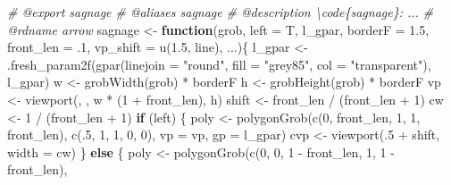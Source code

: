 \documentclass[
]{article}
\newenvironment{Shaded}{\begin{snugshade}}{\end{snugshade}}
\newcommand{\AttributeTok}[1]{\textcolor[rgb]{0.77,0.63,0.00}{#1}}
\newcommand{\CommentTok}[1]{\textcolor[rgb]{0.56,0.35,0.01}{\textit{#1}}}
\newcommand{\ControlFlowTok}[1]{\textcolor[rgb]{0.13,0.29,0.53}{\textbf{#1}}}
\newcommand{\DecValTok}[1]{\textcolor[rgb]{0.00,0.00,0.81}{#1}}
\newcommand{\FloatTok}[1]{\textcolor[rgb]{0.00,0.00,0.81}{#1}}
\newcommand{\FunctionTok}[1]{\textcolor[rgb]{0.00,0.00,0.00}{#1}}
\newcommand{\NormalTok}[1]{#1}
\newcommand{\OtherTok}[1]{\textcolor[rgb]{0.56,0.35,0.01}{#1}}
\newcommand{\SpecialCharTok}[1]{\textcolor[rgb]{0.00,0.00,0.00}{#1}}
\newcommand{\StringTok}[1]{\textcolor[rgb]{0.31,0.60,0.02}{#1}}
\begin{document}
\begin{Shaded}
\begin{Highlighting}[]
\CommentTok{\#\textquotesingle{} @export sagnage}
\CommentTok{\#\textquotesingle{} @aliases sagnage}
\CommentTok{\#\textquotesingle{} @description \textbackslash{}code\{sagnage\}: ...}
\CommentTok{\#\textquotesingle{} @rdname arrow}
\NormalTok{sagnage }\OtherTok{\textless{}{-}} \ControlFlowTok{function}\NormalTok{(grob, }\AttributeTok{left =}\NormalTok{ T, l\_gpar, }\AttributeTok{borderF =} \FloatTok{1.5}\NormalTok{, }\AttributeTok{front\_len =}\NormalTok{ .}\DecValTok{1}\NormalTok{,}
  \AttributeTok{vp\_shift =} \FunctionTok{u}\NormalTok{(}\FloatTok{1.5}\NormalTok{, line), ...)\{}
\NormalTok{  l\_gpar }\OtherTok{\textless{}{-}} \FunctionTok{.fresh\_param2f}\NormalTok{(}\FunctionTok{gpar}\NormalTok{(}\AttributeTok{linejoin =} \StringTok{"round"}\NormalTok{, }\AttributeTok{fill =} \StringTok{"grey85"}\NormalTok{,}
      \AttributeTok{col =} \StringTok{"transparent"}\NormalTok{), l\_gpar)}
\NormalTok{  w }\OtherTok{\textless{}{-}} \FunctionTok{grobWidth}\NormalTok{(grob) }\SpecialCharTok{*}\NormalTok{ borderF}
\NormalTok{  h }\OtherTok{\textless{}{-}} \FunctionTok{grobHeight}\NormalTok{(grob) }\SpecialCharTok{*}\NormalTok{ borderF}
\NormalTok{  vp }\OtherTok{\textless{}{-}} \FunctionTok{viewport}\NormalTok{(, , w }\SpecialCharTok{*}\NormalTok{ (}\DecValTok{1} \SpecialCharTok{+}\NormalTok{ front\_len), h)}
\NormalTok{  shift }\OtherTok{\textless{}{-}}\NormalTok{ front\_len }\SpecialCharTok{/}\NormalTok{ (front\_len }\SpecialCharTok{+} \DecValTok{1}\NormalTok{)}
\NormalTok{  cw }\OtherTok{\textless{}{-}} \DecValTok{1} \SpecialCharTok{/}\NormalTok{ (front\_len }\SpecialCharTok{+} \DecValTok{1}\NormalTok{)}
  \ControlFlowTok{if}\NormalTok{ (left) \{}
\NormalTok{    poly }\OtherTok{\textless{}{-}} \FunctionTok{polygonGrob}\NormalTok{(}\FunctionTok{c}\NormalTok{(}\DecValTok{0}\NormalTok{, front\_len, }\DecValTok{1}\NormalTok{, }\DecValTok{1}\NormalTok{, front\_len), }\FunctionTok{c}\NormalTok{(.}\DecValTok{5}\NormalTok{, }\DecValTok{1}\NormalTok{, }\DecValTok{1}\NormalTok{, }\DecValTok{0}\NormalTok{, }\DecValTok{0}\NormalTok{),}
      \AttributeTok{vp =}\NormalTok{ vp, }\AttributeTok{gp =}\NormalTok{ l\_gpar)}
\NormalTok{    cvp }\OtherTok{\textless{}{-}} \FunctionTok{viewport}\NormalTok{(.}\DecValTok{5} \SpecialCharTok{+}\NormalTok{ shift, }\AttributeTok{width =}\NormalTok{ cw)}
\NormalTok{  \} }\ControlFlowTok{else}\NormalTok{ \{}
\NormalTok{    poly }\OtherTok{\textless{}{-}} \FunctionTok{polygonGrob}\NormalTok{(}\FunctionTok{c}\NormalTok{(}\DecValTok{0}\NormalTok{, }\DecValTok{0}\NormalTok{, }\DecValTok{1} \SpecialCharTok{{-}}\NormalTok{ front\_len, }\DecValTok{1}\NormalTok{, }\DecValTok{1} \SpecialCharTok{{-}}\NormalTok{ front\_len),}

\end{Highlighting}
\end{Shaded}
\end{document}

